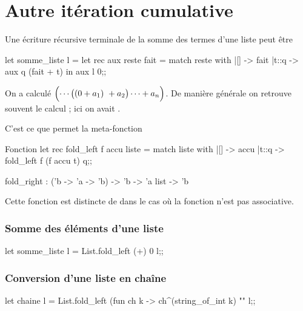 \section{Autre itération cumulative}
Une écriture récursive terminale de la somme des termes d'une liste peut être
\begin{ocaml}
let somme_liste l =
   let rec aux reste fait =
      match reste with
      |[] -> fait
      |t::q -> aux q (fait + t) in
   aux l 0;;
\end{ocaml} 
On a calculé $\Bigl(\cdots \bigl(( 0 + a_1)\ +a_2\bigr)\cdots + a_n\Bigr)$. De manière générale on retrouve souvent le calcul
 ; ici on avait .

C'est ce que permet la meta-fonction
\begin{code}{Fonction }
let rec fold_left f accu liste =
   match liste with
   |[] -> accu
   |t::q -> fold_left f (f accu t) q;;

fold_right : ('b -> 'a -> 'b) -> 'b -> 'a list -> 'b 
\end{code} 
Cette fonction est distincte de  dans le cas où la fonction n'est pas associative.
\subsubsection{Somme des éléments d'une liste}
\begin{ocaml}
let somme_liste l = 
   List.fold_left (+) 0 l;;
\end{ocaml}
\subsubsection{Conversion d'une liste en chaîne}
\begin{ocaml}
let chaine l = 
   List.fold_left (fun ch k -> ch^(string_of_int k) "" l;;
\end{ocaml}
